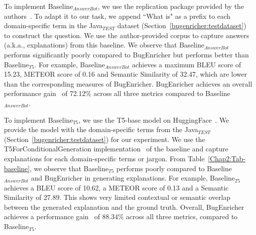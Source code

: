 To implement Baseline$_{AnswerBot}$, we use the replication package provided by the authors~\cite{xu2017answerbot, maxxbw54}. To adapt it to our task, we append ``What is" as a prefix to each domain-specific term in the Java$_{TEST}$ dataset (Section~\ref{bugenricher:testdataset}) to construct the question. We use the author-provided corpus to capture answers (a.k.a., explanations) from this baseline. We observe that Baseline$_{AnswerBot}$ performs significantly poorly compared to BugEnricher but performs better than Baseline$_{T5}$. For example, Baseline$_{AnswerBot}$ achieves a maximum BLEU score of 15.23, METEOR score of 0.16 and Semantic Similarity of 32.47, which are lower than the corresponding measures of BugEnricher. BugEnricher achieves an overall performance gain~\cite{wattanakriengkrai2020predicting} of 72.12\%  across all three metrics compared to Baseline$_{AnswerBot}$.

\renewcommand{\arraystretch}{1.2}
\begin{table}[!t]
\centering
\caption{Baseline Performances}
\end{table}

To implement  Baseline$_{T5}$, we use the T5-base model on HuggingFace~\cite{huggingface_t5}. We provide the model with the domain-specific terms from the Java$_{TEST}$ (Section~\ref{bugenricher:testdataset}) for our experiment. We use the T5ForConditionalGeneration implementation~\cite{huggingface_t5} of the baseline and capture explanations for each domain-specific terms or jargon. From Table~\ref{Chap2:Tab-baseline}, we observe that  Baseline$_{T5}$ performs poorly compared to Baseline$_{AnswerBot}$ and BugEnricher in generating explanations. For example, Baseline$_{T5}$ achieves a BLEU score of 10.62, a METEOR score of 0.13 and a Semantic Similarity of 27.89. This shows very limited contextual or semantic overlap between the generated explanation and the ground truth. Overall, BugEnricher achieves a performance gain~\cite{wattanakriengkrai2020predicting} of 88.34\% across all three metrics, compared to Baseline$_{T5}$.

